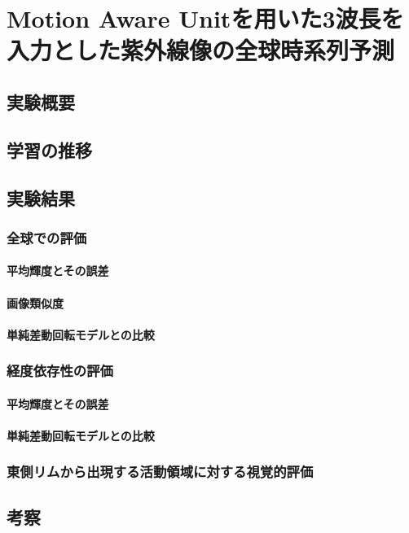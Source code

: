 \chapter{Motion Aware Unitを用いた3波長を入力とした紫外線像の全球時系列予測}
  \section{実験概要}
  \section{学習の推移}
  \section{実験結果}
    \subsection{全球での評価}
      \subsubsection{平均輝度とその誤差}
      \subsubsection{画像類似度}
      \subsubsection{単純差動回転モデルとの比較}
      \subsection{経度依存性の評価}
        \subsubsection{平均輝度とその誤差}
        \subsubsection{単純差動回転モデルとの比較}
    \subsection{東側リムから出現する活動領域に対する視覚的評価}
  \section{考察}
